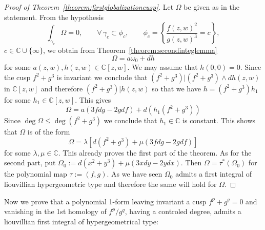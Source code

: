 \documentclass[11pt,a4paper]{amsart}
\theoremstyle{definition}
\begin{document}
\begin{proof}[Proof of Theorem~\ref{theorem:firstglobalizationcusp}]

Let $\Omega$ be given as in the statement. 
From the hypothesis
\[
\int_{\gamma_c} \Omega = 0,
\qquad
\forall\, \gamma_c \subset \phi_c,
\qquad
\phi_c=\left\{\frac{f(z,w)^2}{g(z,w)^3}=c\right\},
\]
$c\in\mathbb{C}\cup\{\infty\}$,
we obtain
from Theorem~\ref{theorem:secondinteglemma}  
\[
\Omega = a\omega_0 + dh
\]
for some $a(z,w), h(z,w)\in \mathbb C[z,w]$. We may assume that $h(0,0)=0$.
Since the cusp $f^2 + g^3$ is invariant we conclude that $(f^2 + g^3) \big|(f^2 + g^3)\wedge dh(z,w)$ in $\mathbb C[z,w]$ and 
therefore $(f^2 + g^3) \big|h(z,w)$ so that we have $h=(f^2 + g^3) h_1$ for some $h_1 \in \mathbb C[z,w]$. 
 This gives 
 \[ 
 \Omega= a(3fdg - 2g df ) + d(h_1(f^2 + g^3))
 \]
Since $\deg \Omega \leq \deg (f^2 + g^3)$ we conclude that 
$h_1 \in \mathbb C$ is constant. This shows that $\Omega$ is of the form 
\[ 
\Omega = \lambda [d(f^2 + g^3) + \mu (3fdg - 2g df)]
\]
for some $\lambda, \mu \in \mathbb C$.   
This already proves the first part of the theorem. 
As for the second part, put $\Omega_0:=d(x^2 + y^3) + \mu(3xdy - 2 y dx)$. Then 
$\Omega=\tau^*(\Omega_0)$ for the polynomial map 
$\tau:=(f,g)$. As we have seen $\Omega_0$ admits a first integral of liouvillian hypergeometric type and therefore 
the same will hold for $\Omega$.
\end{proof}
Now we prove that a  polynomial 1-form leaving invariant a cusp $f^p + g ^q=0$ and vanishing in the 1st homology of $f^p/g^q$, having a controled degree, admits a liouvillian 
first integral of hypergeometrical type:
\end{document}
